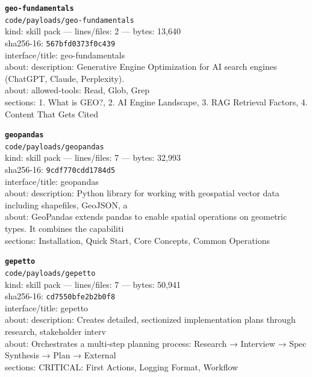 \noindent\textbf{\texttt{geo-fundamentals}}\\
\texttt{code/payloads/geo-fundamentals}\\
kind: skill pack --- lines/files: 2 --- bytes: 13,640\\
sha256-16: \texttt{567bfd0373f0c439}\\
interface/title: geo-fundamentals\\
about: description: Generative Engine Optimization for AI search engines (ChatGPT, Claude, Perplexity).\\
about: allowed-tools: Read, Glob, Grep\\
sections: 1. What is GEO?, 2. AI Engine Landscape, 3. RAG Retrieval Factors, 4. Content That Gets Cited\\
\vspace*{6.0pt}

\noindent\textbf{\texttt{geopandas}}\\
\texttt{code/payloads/geopandas}\\
kind: skill pack --- lines/files: 7 --- bytes: 32,993\\
sha256-16: \texttt{9cdf770cdd1784d5}\\
interface/title: geopandas\\
about: description: Python library for working with geospatial vector data including shapefiles, GeoJSON, a\\
about: GeoPandas extends pandas to enable spatial operations on geometric types. It combines the capabiliti\\
sections: Installation, Quick Start, Core Concepts, Common Operations\\
\vspace*{6.0pt}
\newpage

\noindent\textbf{\texttt{gepetto}}\\
\texttt{code/payloads/gepetto}\\
kind: skill pack --- lines/files: 7 --- bytes: 50,941\\
sha256-16: \texttt{cd7550bfe2b2b0f8}\\
interface/title: gepetto\\
about: description: Creates detailed, sectionized implementation plans through research, stakeholder interv\\
about: Orchestrates a multi-step planning process: Research → Interview → Spec Synthesis → Plan → External \\
sections: CRITICAL: First Actions, Logging Format, Workflow\\
\vspace*{6.0pt}

